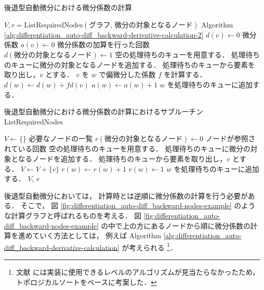 \begin{algorithm}[tp]
    \caption{後退型自動微分における微分係数の計算}
    \label{alg:differentiation_auto-diff_backward-derivative-calculation}
    \begin{algorithmic}
        \State $V, r = \text{ListRequiredNodes}(\text{グラフ, 微分の対象となるノード})$
        \Comment Algorithm \ref{alg:differentiation_auto-diff_backward-derivative-calculation-2}
        \State $d(v) \gets 0$ \Comment 微分係数
        \State $a(v) \gets 0$ \Comment 微分係数の加算を行った回数
        \EndFor
        \State $d(\text{微分の対象となるノード}) \gets 1$
        \State 空の処理待ちのキューを用意する．
        \State 処理待ちのキューに微分の対象となるノードを追加する．
        \State 処理待ちのキューから要素を取り出し，$v$ とする．
        \State $v$ を $w$ で偏微分した係数 $f$ を計算する．
        \State $d(w) \gets d(w) + f d(v)$
        \State $a(w) \gets a(w) + 1$
        \State $w$ を処理待ちのキューに追加する．
        \EndIf
        \EndFor
        \EndWhile
        \EndProcedure
    \end{algorithmic}
\end{algorithm}
\begin{algorithm}[tp]
    \caption{後退型自動微分における微分係数の計算におけるサブルーチン ListRequiredNodes}
    \label{alg:differentiation_auto-diff_backward-derivative-calculation-2}
    \begin{algorithmic}
        \State $V \gets \{\}$ \Comment 必要なノードの一覧
        \State $r(\text{微分の対象となるノード}) \gets 0$ \Comment ノードが参照されている回数
        \State 空の処理待ちのキューを用意する．
        \State 処理待ちのキューに微分の対象となるノードを追加する．
        \State 処理待ちのキューから要素を取り出し，$v$ とする．
        \State $V \gets V + \{v\}$
        \State $r(w) \gets r(w) + 1$
        \Else
        \State $r(w) \gets 1$
        \EndIf
        \State $w$ を処理待ちのキューに追加する．
        \EndIf
        \EndFor
        \EndWhile
        \State \Return $V$, $r$
        \EndProcedure
    \end{algorithmic}
\end{algorithm}

後退型自動微分においては，
計算時とは逆順に微分係数の計算を行う必要がある．
そこで，
図 \ref{fig:differentiation_auto-diff_backward-nodes-example}
のような計算グラフと呼ばれるものを考える\cite{Kubota1998}．
図 \ref{fig:differentiation_auto-diff_backward-nodes-example}
の中で上の方にあるノードから順に微分係数の計算を進めていく方法としては，
例えば
Algorithm \ref{alg:differentiation_auto-diff_backward-derivative-calculation}
が考えられる
\footnote{文献 \cite{Kubota1998} には実装に使用できるレベルのアルゴリズムが見当たらなかったため，%
    トポロジカルソートをベースに考案した．}．
